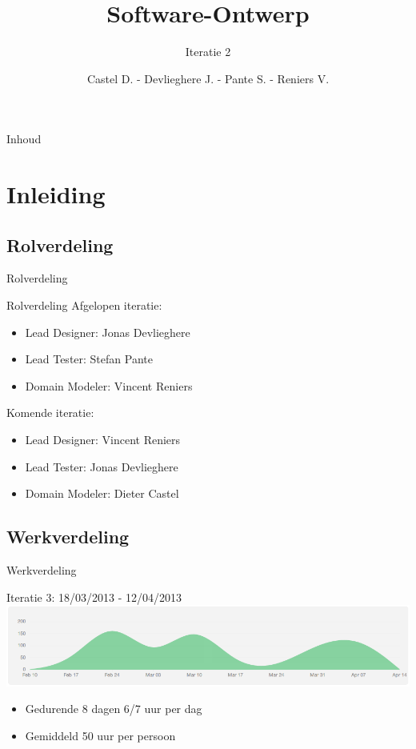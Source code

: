 \documentclass[t]{beamer}
\title{Software-Ontwerp}
\subtitle{Iteratie 2}
\author{Castel D. - Devlieghere J. - Pante S. - Reniers V.}
\institute{KU Leuven}
\begin{document}
\frame{\titlepage} 
\begin{frame}{Inhoud}
\begin{multicols}{2}
\tableofcontents
\end{multicols}
\end{frame}



\section{Inleiding} 

\subsection{Rolverdeling}

\begin{frame}{Rolverdeling}
\begin{multicols}{2}
\tableofcontents[currentsection]
\end{multicols}
\end{frame}

\begin{frame}{Rolverdeling}
Afgelopen iteratie:
\begin{itemize}
	\item Lead Designer: Jonas Devlieghere
	\item Lead Tester: Stefan Pante
	\item Domain Modeler: Vincent Reniers
\end{itemize}
Komende iteratie:
\begin{itemize}
	\item Lead Designer: Vincent Reniers
	\item Lead Tester: Jonas Devlieghere
	\item Domain Modeler: Dieter Castel
\end{itemize}
\end{frame}

\subsection{Werkverdeling}

\begin{frame}{Werkverdeling}
\begin{center}
Iteratie 3: 18/03/2013 - 12/04/2013
\includegraphics[width= 0.9\linewidth]{images/workload}
\end{center}
\begin{itemize}
	\item Gedurende 8 dagen 6/7 uur per dag
	\item Gemiddeld 50 uur per persoon
\end{itemize}

\end{frame}
\end{document}
